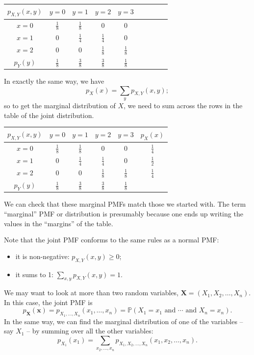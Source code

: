 \documentclass[
  a4paper,
]{book}
\providecommand{\tightlist}{%
  \setlength{\itemsep}{0pt}\setlength{\parskip}{0pt}}
\theoremstyle{definition}
\theoremstyle{definition}
\theoremstyle{definition}
\theoremstyle{definition}
\theoremstyle{remark}
\begin{document}
\begin{longtable}[]{@{}cccccc@{}}
\toprule
\(p_{X,Y}(x,y)\) & \(y = 0\) & \(y = 1\) & \(y = 2\) & \(y = 3\) & \(\phantom{p_X(x)}\) \\
\midrule
\endhead
\(x=0\) & \(\frac18\) & \(\frac18\) & \(0\) & \(0\) & \\
\(x=1\) & \(0\) & \(\frac14\) & \(\frac14\) & \(0\) & \\
\(x=2\) & \(0\) & \(0\) & \(\frac18\) & \(\frac18\) & \\
\(p_Y(y)\) & \(\frac18\) & \(\frac38\) & \(\frac38\) & \(\frac18\) & \\
\bottomrule
\end{longtable}

In exactly the same way, we have
\[ p_X(x) = \sum_y p_{X,Y}(x, y) ; \]
so to get the marginal distribution of \(X\), we need to sum across the rows in the table of the joint distribution.

\begin{longtable}[]{@{}cccccc@{}}
\toprule
\(p_{X,Y}(x,y)\) & \(y = 0\) & \(y = 1\) & \(y = 2\) & \(y = 3\) & \(p_X(x)\) \\
\midrule
\endhead
\(x=0\) & \(\frac18\) & \(\frac18\) & \(0\) & \(0\) & \(\frac14\) \\
\(x=1\) & \(0\) & \(\frac14\) & \(\frac14\) & \(0\) & \(\frac12\) \\
\(x=2\) & \(0\) & \(0\) & \(\frac18\) & \(\frac18\) & \(\frac14\) \\
\(p_Y(y)\) & \(\frac18\) & \(\frac38\) & \(\frac38\) & \(\frac18\) & \\
\bottomrule
\end{longtable}

We can check that these marginal PMFs match those we started with. The term ``marginal'' PMF or distribution is presumably because one ends up writing the values in the ``margins'' of the table.

Note that the joint PMF conforms to the same rules as a normal PMF:

\begin{itemize}
\tightlist
\item
  it is non-negative: \(p_{X,Y}(x,y) \geq 0\);
\item
  it sums to 1: \(\displaystyle\sum_{x,y} p_{X,Y}(x,y) = 1\).
\end{itemize}

We may want to look at more than two random variables, \(\mathbf X = (X_1, X_2, \dots, X_n)\). In this case, the joint PMF is
\[ p_{\mathbf X}(\mathbf x) = p_{X_1, \dots, X_n}(x_1, \dots, x_n) = \mathbb P(X_1 = x_1 \text{ and } \cdots \text{ and } X_n = x_n) .   \]
In the same way, we can find the marginal distribution of one of the variables -- say \(X_1\) -- by summing over all the other variables:
\[ p_{X_1}(x_1) = \sum_{x_2, \dots, x_n} p_{X_1, X_2, \dots, X_n}(x_1, x_2, \dots, x_n) . \]
\end{document}
